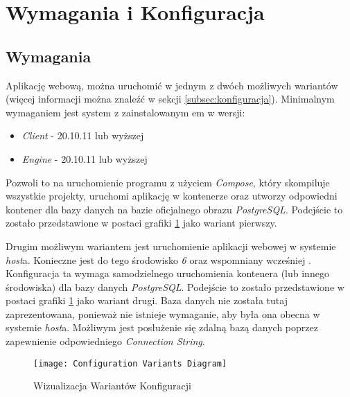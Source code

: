 \section{Wymagania i Konfiguracja}
\label{sec:wymaganiaIKonfiguracja}

\subsection{Wymagania}
\par Aplikację webową, można uruchomić w jednym z dwóch możliwych wariantów (więcej informacji można znaleźć w sekcji \ref{subsec:konfiguracja}). Minimalnym wymaganiem jest system z zainstalowanym \emph{\docker}em w wersji:

\begin{itemize}
	\item \emph{\docker{} Client} - 20.10.11 lub wyższej
	\item \emph{\docker{} Engine} - 20.10.11 lub wyższej
\end{itemize}

\par Pozwoli to na uruchomienie programu z użyciem \emph{\docker{} Compose}, który skompiluje wszystkie projekty, uruchomi aplikację w kontenerze oraz utworzy odpowiedni kontener dla bazy danych na bazie oficjalnego obrazu \emph{PostgreSQL}. Podejście to zostało przedstawione w postaci grafiki \ref{fig:wizualizacjaWariantowKonfiguracji} jako wariant pierwszy.

\par Drugim możliwym wariantem jest uruchomienie aplikacji webowej w systemie \emph{host}a. Konieczne jest do tego środowisko \emph{\dotnet{} 6} oraz wspomniany wcześniej \emph{\docker{}}. Konfiguracja ta wymaga samodzielnego uruchomienia kontenera (lub innego środowiska) dla bazy danych \emph{PostgreSQL}. Podejście to zostało przedstawione w postaci grafiki \ref{fig:wizualizacjaWariantowKonfiguracji} jako wariant drugi. Baza danych nie została tutaj zaprezentowana, ponieważ nie istnieje wymaganie, aby była ona obecna w systemie \emph{host}a. Możliwym jest posłużenie się zdalną bazą danych poprzez zapewnienie odpowiedniego \emph{Connection String}.

\begin{figure}[H]
	\texttt{[image: Configuration Variants Diagram]}
	\caption{Wizualizacja Wariantów Konfiguracji}
	\label{fig:wizualizacjaWariantowKonfiguracji}
\end{figure}

